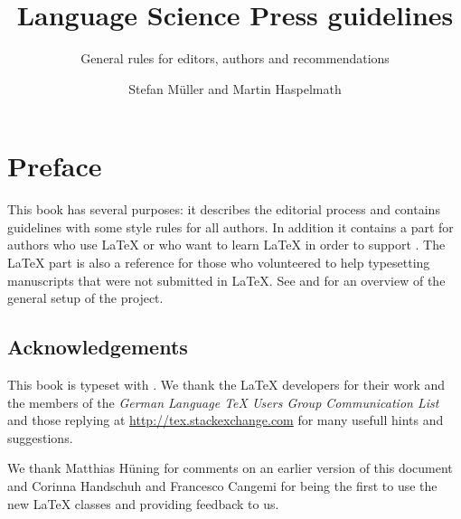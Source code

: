 \documentclass[ number=??
                ,series=lnls,
                ,isbn=xxx-x-xxxxxx-xx-x,
                ,url=http://langsci-press.org/catalog/book/14,
	        ,output=long    %
	        ,draftmode  
		  ]{LSP/langsci}
\title{Language Science Press guidelines}
\subtitle{General rules for editors, authors and \latex recommendations}
\author{Stefan Müller and Martin Haspelmath}
\newcommand{\latex}{\LaTeX\xspace}
\begin{document}
               
         
                                                                           
                                  
\maketitle                


\chapter*{Preface}


This book has several purposes: it describes the editorial process and contains guidelines with some style rules for all
authors. In addition it contains a part for authors who use \latex or who want to learn \latex in order to
support \lsp. The \latex part is also a reference for those who volunteered to help typesetting
manuscripts that were not submitted in \latex. See  and  for an overview of the
general setup of the project.

\section*{Acknowledgements}




This book is typeset with \xelatex. We thank the \latex developers for their work and the members of
the \textit{German Language TeX Users Group Communication List} and those replying at \url{http://tex.stackexchange.com} for many usefull hints and suggestions.

We thank Matthias Hüning for comments on an earlier version of this document and Corinna Handschuh
and Francesco Cangemi for being the first to use the new \latex classes and providing feedback
to us.
\end{document}
